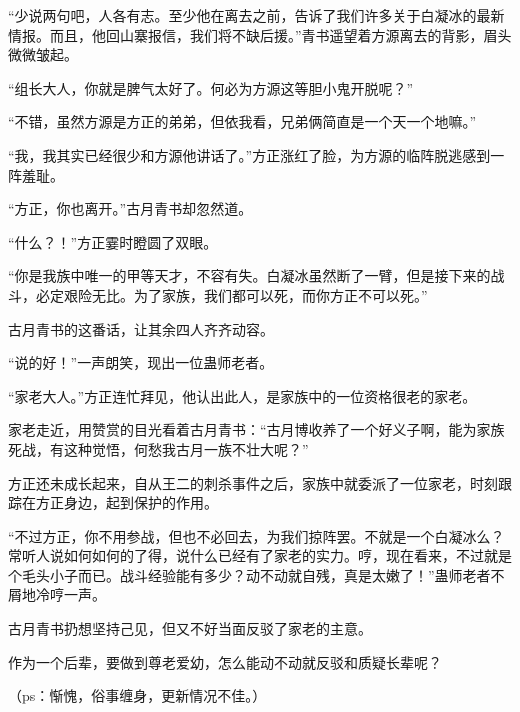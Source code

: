 \begin{this_body}
“少说两句吧，人各有志。至少他在离去之前，告诉了我们许多关于白凝冰的最新情报。而且，他回山寨报信，我们将不缺后援。”青书遥望着方源离去的背影，眉头微微皱起。

“组长大人，你就是脾气太好了。何必为方源这等胆小鬼开脱呢？”

“不错，虽然方源是方正的弟弟，但依我看，兄弟俩简直是一个天一个地嘛。”

“我，我其实已经很少和方源他讲话了。”方正涨红了脸，为方源的临阵脱逃感到一阵羞耻。

“方正，你也离开。”古月青书却忽然道。

“什么？！”方正霎时瞪圆了双眼。

“你是我族中唯一的甲等天才，不容有失。白凝冰虽然断了一臂，但是接下来的战斗，必定艰险无比。为了家族，我们都可以死，而你方正不可以死。”

古月青书的这番话，让其余四人齐齐动容。

“说的好！”一声朗笑，现出一位蛊师老者。

“家老大人。”方正连忙拜见，他认出此人，是家族中的一位资格很老的家老。

家老走近，用赞赏的目光看着古月青书：“古月博收养了一个好义子啊，能为家族死战，有这种觉悟，何愁我古月一族不壮大呢？”

方正还未成长起来，自从王二的刺杀事件之后，家族中就委派了一位家老，时刻跟踪在方正身边，起到保护的作用。

“不过方正，你不用参战，但也不必回去，为我们掠阵罢。不就是一个白凝冰么？常听人说如何如何的了得，说什么已经有了家老的实力。哼，现在看来，不过就是个毛头小子而已。战斗经验能有多少？动不动就自残，真是太嫩了！”蛊师老者不屑地冷哼一声。

古月青书扔想坚持己见，但又不好当面反驳了家老的主意。

作为一个后辈，要做到尊老爱幼，怎么能动不动就反驳和质疑长辈呢？

（ps：惭愧，俗事缠身，更新情况不佳。）

\end{this_body}

